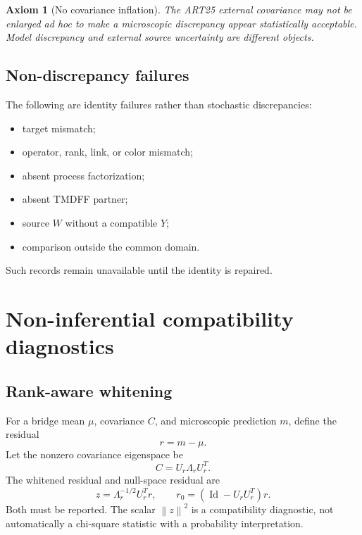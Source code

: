 \documentclass[11pt]{article}
\newtheorem{axiom}[definition]{Axiom}
\newcommand{\Id}{\operatorname{Id}}
\newcommand{\norm}[1]{\left\lVert #1\right\rVert}
\begin{document}
\begin{axiom}[No covariance inflation]
The ART25 external covariance may not be enlarged ad hoc to make a microscopic discrepancy appear statistically acceptable.  Model discrepancy and external source uncertainty are different objects.
\end{axiom}

\subsection{Non-discrepancy failures}

The following are identity failures rather than stochastic discrepancies:
\begin{itemize}
\item target mismatch;
\item operator, rank, link, or color mismatch;
\item absent process factorization;
\item absent TMDFF partner;
\item source \(W\) without a compatible \(Y\);
\item comparison outside the common domain.
\end{itemize}
Such records remain unavailable until the identity is repaired.

\section{Non-inferential compatibility diagnostics}
\label{sec:diagnostics}

\subsection{Rank-aware whitening}

For a bridge mean \(\mu\), covariance \(C\), and microscopic prediction \(m\), define the residual
\begin{equation}
 r=m-\mu.
 \label{eq:residual}
\end{equation}
Let the nonzero covariance eigenspace be
\begin{equation}
 C=U_r\Lambda_rU_r^T.
 \label{eq:rank-decomp}
\end{equation}
The whitened residual and null-space residual are
\begin{equation}
 z=\Lambda_r^{-1/2}U_r^Tr,
 \qquad
 r_0=(\Id-U_rU_r^T)r.
 \label{eq:whitened-null}
\end{equation}
Both must be reported.  The scalar \(\norm{z}^2\) is a compatibility diagnostic, not automatically a chi-square statistic with a probability interpretation.
\end{document}
